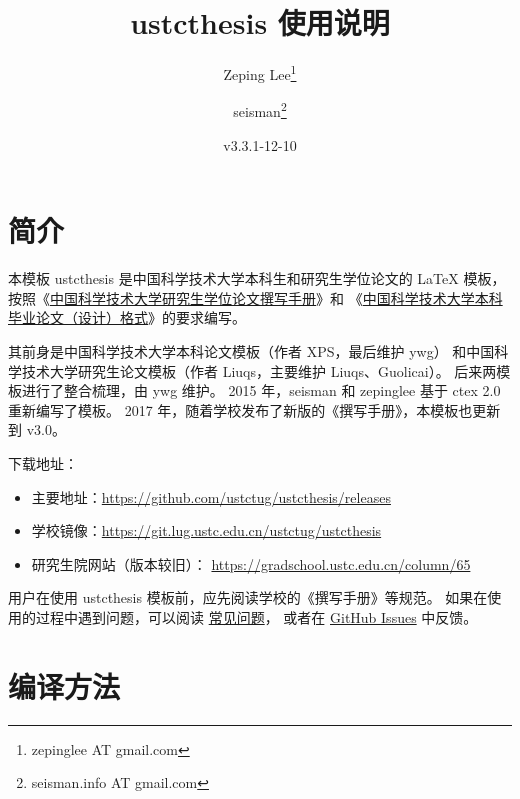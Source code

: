 \documentclass[a4paper]{ltxdoc}
\DeclareRobustCommand\pkg{\textsf}
\DeclareRobustCommand\cls{\textsf}
\begin{document}
\title{\cls{ustcthesis} 使用说明}
\author{Zeping Lee\thanks{zepinglee AT gmail.com} \and
        seisman\thanks{seisman.info AT gmail.com} }
\date{v3.3.1-12-10}
\maketitle



\section{简介}

本模板 \cls{ustcthesis} 是中国科学技术大学本科生和研究生学位论文的 \LaTeX{}
模板， 按照《\href{https://gradschool.ustc.edu.cn/static/upload/article/picture/ce3b02e5f0274c90b9331ef50ae1ac26.pdf}
{中国科学技术大学研究生学位论文撰写手册}》和
《\href{https://www.teach.ustc.edu.cn/?attachment_id=13867}
{中国科学技术大学本科毕业论文（设计）格式}》的要求编写。

其前身是中国科学技术大学本科论文模板（作者 XPS，最后维护 ywg）
和中国科学技术大学研究生论文模板（作者 Liuqs，主要维护 Liuqs、Guolicai）。
后来两模板进行了整合梳理，由 ywg 维护。
2015 年，seisman 和 zepinglee 基于 \pkg{ctex} 2.0 重新编写了模板。
2017 年，随着学校发布了新版的《撰写手册》，本模板也更新到 v3.0。

下载地址：
\begin{itemize}
  \item 主要地址：\url{https://github.com/ustctug/ustcthesis/releases}
  \item 学校镜像：\url{https://git.lug.ustc.edu.cn/ustctug/ustcthesis}
  \item 研究生院网站（版本较旧）：
    \url{https://gradschool.ustc.edu.cn/column/65}
\end{itemize}

用户在使用 \pkg{ustcthesis} 模板前，应先阅读学校的《撰写手册》等规范。
如果在使用的过程中遇到问题，可以阅读
\href{https://github.com/ustctug/ustcthesis/wiki}{常见问题}，
或者在 \href{https://github.com/ustctug/ustcthesis/issues}{GitHub Issues}
中反馈。



\section{编译方法}
\end{document}
